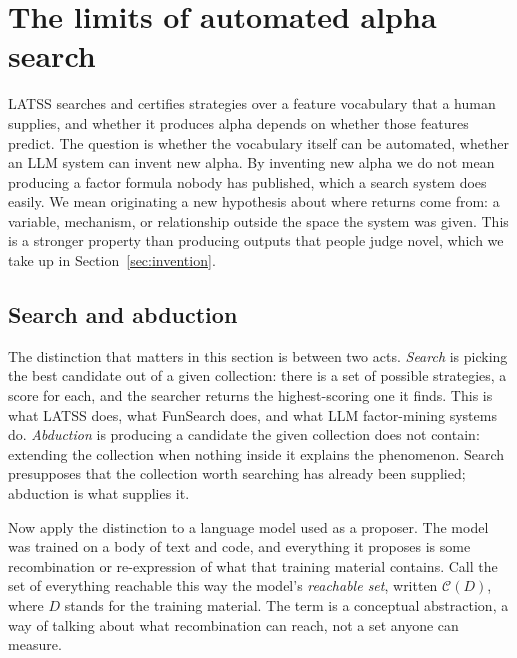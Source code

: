 \documentclass[11pt]{article}
\begin{document}
\section{The limits of automated alpha search}
\label{sec:ceiling}

LATSS searches and certifies strategies over a feature vocabulary that a human supplies, and whether
it produces alpha depends on whether those features predict. The question is whether the vocabulary
itself can be automated, whether an LLM system can invent new alpha. By inventing new alpha we do not
mean producing a factor formula nobody has published, which a search system does easily. We mean
originating a new hypothesis about where returns come from: a variable, mechanism, or relationship
outside the space the system was given. This is a stronger property than producing outputs that people
judge novel, which we take up in Section~\ref{sec:invention}.

\subsection{Search and abduction}
\label{sec:formal}

The distinction that matters in this section is between two acts. \emph{Search} is picking the best
candidate out of a given collection: there is a set of possible strategies, a score for each, and the
searcher returns the highest-scoring one it finds. This is what LATSS does, what FunSearch does, and
what LLM factor-mining systems do. \emph{Abduction} is producing a candidate the given collection does
not contain: extending the collection when nothing inside it explains the phenomenon. Search
presupposes that the collection worth searching has already been supplied; abduction is what supplies
it.

Now apply the distinction to a language model used as a proposer. The model was trained on a body of
text and code, and everything it proposes is some recombination or re-expression of what that training
material contains. Call the set of everything reachable this way the model's \emph{reachable set},
written $\mathcal{C}(D)$, where $D$ stands for the training material. The term is a conceptual
abstraction, a way of talking about what recombination can reach, not a set anyone can measure.
\end{document}
